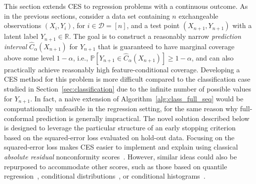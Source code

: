 This section extends CES to regression problems with a continuous outcome.
As in the previous sections, consider a data set containing $n$ exchangeable observations $(X_i,Y_i)$, for $i \in \mathcal{D} = [n]$, and a test point $(X_{n+1}, Y_{n+1})$ with a latent label $Y_{n+1} \in \mathbb{R}$. The goal is to construct a reasonably narrow {\em prediction interval} $\hat{C}_{\alpha}(X_{n+1})$ for $Y_{n+1}$ that is guaranteed to have marginal coverage above some level $1-\alpha$, i.e., $\mathbb{P}[Y_{n+1} \in \hat{C}_{\alpha}(X_{n+1}) ] \geq 1-\alpha$, and can also practically achieve reasonably high feature-conditional coverage.
Developing a CES method for this problem is more difficult compared to the classification case studied in Section~\ref{sec:classification} due to the infinite number of possible values for $Y_{n+1}$. In fact, a naive extension of Algorithm~\ref{alg:class_full_seq} would be computationally unfeasible in the regression setting, for the same reason why full-conformal prediction \citep{vovk2005algorithmic} is generally impractical.
The novel solution described below is designed to leverage the particular structure of an early stopping criterion based on the squared-error loss evaluated on hold-out data. Focusing on the squared-error loss makes CES easier to implement and explain using classical {\em absolute residual} nonconformity scores~\citep{vovk2005algorithmic,lei2016RegressionPS}.
However, similar ideas could also be repurposed to accommodate other scores, such as those based on quantile regression~\citep{romano2019conformalized}, conditional distributions~\citep{chernozhukov2019distributional,izbicki2019flexible}, or conditional histograms~\citep{sesia2021conformal}.

